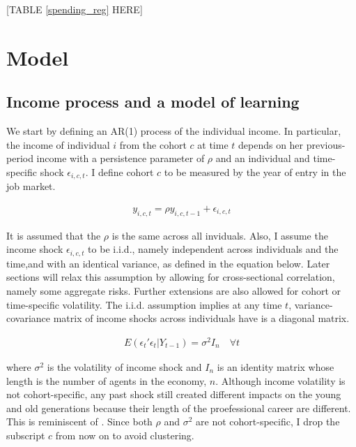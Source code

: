 \documentclass[12pt,notitlepage,onecolumn,aps,pra]{article}
\begin{document}
{[}TABLE \ref{spending_reg} HERE{]}



    \hypertarget{model}{%
\section{Model}\label{model}}

\hypertarget{income-process-and-a-model-of-learning}{%
\subsection{Income process and a model of
learning}\label{income-process-and-a-model-of-learning}}

We start by defining an AR(1) process of the individual income. In
particular, the income of individual \(i\) from the cohort \(c\) at time
\(t\) depends on her previous-period income with a persistence parameter
of \(\rho\) and an individual and time-specific shock
\(\epsilon_{i,c,t}\). I define cohort \(c\) to be measured by the year
of entry in the job market.

\begin{eqnarray}
y_{i,c,t} = \rho y_{i,c,t-1} + \epsilon_{i,c,t}
\end{eqnarray}

It is assumed that the \(\rho\) is the same across all inviduals. Also,
I assume the income shock \(\epsilon_{i,c,t}\) to be i.i.d., namely
independent across individuals and the time,and with an identical
variance, as defined in the equation below. Later sections will relax
this assumption by allowing for cross-sectional correlation, namely some
aggregate risks. Further extensions are also allowed for cohort or
time-specific volatility. The i.i.d. assumption implies at any time
\(t\), variance-covariance matrix of income shocks across individuals
have is a diagonal matrix.

\begin{eqnarray}
E(\epsilon_{t}'\epsilon_{t}|Y_{t-1}) = \sigma^2 I_n \quad \forall t 
\end{eqnarray}

where \(\sigma^2\) is the volatility of income shock and \(I_n\) is an
identity matrix whose length is the number of agents in the economy,
\(n\). Although income volatility is not cohort-specific, any past shock
still created different impacts on the young and old generations because
their length of the proefessional career are different. This is
reminiscent of \cite{bansal2004risks}. Since both \(\rho\) and
\(\sigma^2\) are not cohort-specific, I drop the subscript \(c\) from
now on to avoid clustering.
\end{document}
